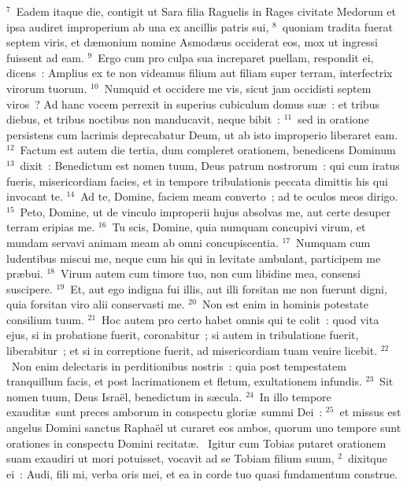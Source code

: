 ${}^{7}$~Eadem itaque die, contigit ut Sara filia Raguelis in Rages civitate Medorum et ipsa audiret improperium ab una ex ancillis patris sui,
${}^{8}$~quoniam tradita fuerat septem viris, et d\ae monium nomine Asmod\ae us occiderat eos, mox ut ingressi fuissent ad eam.
${}^{9}$~Ergo cum pro culpa sua increparet puellam, respondit ei, dicens~: Amplius ex te non videamus filium aut filiam super terram, interfectrix virorum tuorum.
${}^{10}$~Numquid et occidere me vis, sicut jam occidisti septem viros~? Ad hanc vocem perrexit in superius cubiculum domus su\ae~: et tribus diebus, et tribus noctibus non manducavit, neque bibit~:
${}^{11}$~sed in oratione persistens cum lacrimis deprecabatur Deum, ut ab isto improperio liberaret eam.
${}^{12}$~Factum est autem die tertia, dum compleret orationem, benedicens Dominum
${}^{13}$~dixit~: Benedictum est nomen tuum, Deus patrum nostrorum~: qui cum iratus fueris, misericordiam facies, et in tempore tribulationis peccata dimittis his qui invocant te.
${}^{14}$~Ad te, Domine, faciem meam converto~; ad te oculos meos dirigo.
${}^{15}$~Peto, Domine, ut de vinculo improperii hujus absolvas me, aut certe desuper terram eripias me.
${}^{16}$~Tu scis, Domine, quia numquam concupivi virum, et mundam servavi animam meam ab omni concupiscentia.
${}^{17}$~Numquam cum ludentibus miscui me, neque cum his qui in levitate ambulant, participem me pr\ae bui.
${}^{18}$~Virum autem cum timore tuo, non cum libidine mea, consensi suscipere.
${}^{19}$~Et, aut ego indigna fui illis, aut illi forsitan me non fuerunt digni, quia forsitan viro alii conservasti me.
${}^{20}$~Non est enim in hominis potestate consilium tuum.
${}^{21}$~Hoc autem pro certo habet omnis qui te colit~: quod vita ejus, si in probatione fuerit, coronabitur~; si autem in tribulatione fuerit, liberabitur~; et si in correptione fuerit, ad misericordiam tuam venire licebit.
${}^{22}$~Non enim delectaris in perditionibus nostris~: quia post tempestatem tranquillum facis, et post lacrimationem et fletum, exultationem infundis.
${}^{23}$~Sit nomen tuum, Deus Isra\"el, benedictum in s\ae cula.
${}^{24}$~In illo tempore exaudit\ae\ sunt preces amborum in conspectu glori\ae\ summi Dei~:
${}^{25}$~et missus est angelus Domini sanctus Rapha\"el ut curaret eos ambos, quorum uno tempore sunt orationes in conspectu Domini recitat\ae .
~\lettrine[lines=10,image=true,loversize=0.05,lraise=-0.03]{I}{}gitur cum Tobias putaret orationem suam exaudiri ut mori potuisset, vocavit ad se Tobiam filium suum,
${}^{2}$~dixitque ei~: Audi, fili mi, verba oris mei, et ea in corde tuo quasi fundamentum construe.
